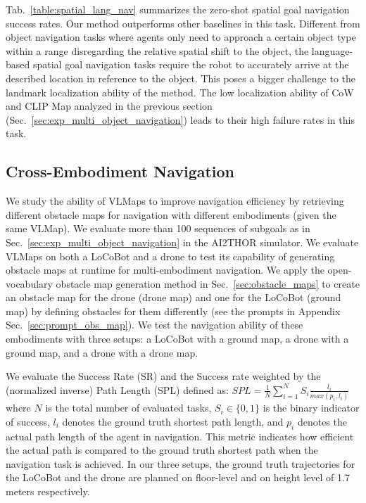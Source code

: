 \documentclass[letterpaper, 10 pt, conference]{ieeeconf}  %
\begin{document}
Tab.~\ref{table:spatial_lang_nav} summarizes the zero-shot spatial goal navigation success rates. Our method outperforms other baselines in this task. Different from object navigation tasks where agents only need to approach a certain object type within a range disregarding the relative spatial shift to the object, the language-based spatial goal navigation tasks require the robot to accurately arrive at the described location in reference to the object. This poses a bigger challenge to the landmark localization ability of the method. The low localization ability of CoW and CLIP Map analyzed in the previous section (Sec.~\ref{sec:exp_multi_object_navigation}) leads to their high failure rates in this task.


\subsection{Cross-Embodiment Navigation}
\label{sec:exp_multi_embodiment_navigation}
We study the ability of VLMaps to improve navigation efficiency by retrieving different obstacle maps for navigation with different embodiments (given the same VLMap). We evaluate more than 100 sequences of subgoals as in Sec.~\ref{sec:exp_multi_object_navigation} in the AI2THOR simulator. We evaluate VLMaps on both a LoCoBot and a drone to test its capability of generating obstacle maps at runtime for multi-embodiment navigation. We apply the open-vocabulary obstacle map generation method in Sec.~\ref{sec:obstacle_maps} to create an obstacle map for the drone (drone map) and one for the LoCoBot (ground map) by defining obstacles for them differently (see the prompts in Appendix Sec.~\ref{sec:prompt_obs_map}). We test the navigation ability of these embodiments with three setups: a LoCoBot with a ground map, a drone with a ground map, and a drone with a drone map.

We evaluate the Success Rate (SR) and the Success rate weighted by the (normalized inverse) Path Length (SPL) \cite{anderson2018evaluation} defined as: $SPL = \frac{1}{N} \sum_{i=1} ^{N} S_i \frac{\textit{l}_i}{max(\textit{p}_i, \textit{l}_i)}$
where $N$ is the total number of evaluated tasks, $S_i \in \{0, 1\}$ is the binary indicator of success, $\textit{l}_i$ denotes the ground truth shortest path length, and $\textit{p}_i$ denotes the actual path length of the agent in navigation. This metric indicates how efficient the actual path is compared to the ground truth shortest path when the navigation task is achieved. In our three setups, the ground truth trajectories for the LoCoBot and the drone are planned on floor-level and on height level of 1.7 meters respectively.
\end{document}
